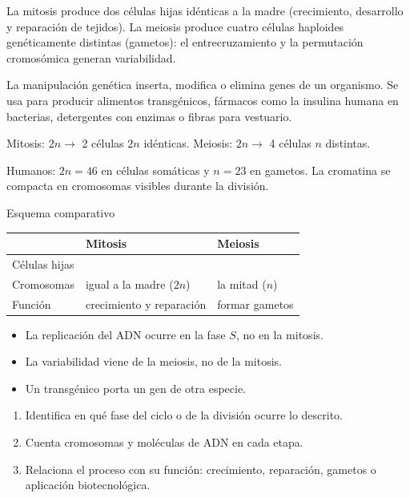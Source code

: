 \documentclass[10pt,a4paper,twocolumn]{article}
\begin{document}
La mitosis produce dos células hijas idénticas a la madre (crecimiento, desarrollo y reparación de tejidos). La meiosis produce cuatro células haploides genéticamente distintas (gametos): el entrecruzamiento y la permutación cromosómica generan variabilidad.

La manipulación genética inserta, modifica o elimina genes de un organismo. Se usa para producir alimentos transgénicos, fármacos como la insulina humana en bacterias, detergentes con enzimas o fibras para vestuario.

\begin{mecanismo}
Mitosis: $2n\rightarrow$ 2 células $2n$ idénticas. Meiosis: $2n\rightarrow$ 4 células $n$ distintas.

Humanos: $2n=46$ en células somáticas y $n=23$ en gametos. La cromatina se compacta en cromosomas visibles durante la división.
\end{mecanismo}

{\sffamily\footnotesize\color{zinc500} Esquema comparativo}
\begin{center}\small
\begin{tabular}{@{}>{\raggedright\arraybackslash}p{\dimexpr(\linewidth-4\tabcolsep)/3\relax}>{\raggedright\arraybackslash}p{\dimexpr(\linewidth-4\tabcolsep)/3\relax}>{\raggedright\arraybackslash}p{\dimexpr(\linewidth-4\tabcolsep)/3\relax}@{}}
\toprule
 & \textbf{Mitosis} & \textbf{Meiosis} \\
\midrule
Células hijas & 2 & 4 \\
Cromosomas & igual a la madre ($2n$) & la mitad ($n$) \\
Función & crecimiento y reparación & formar gametos \\
\bottomrule
\end{tabular}
\end{center}

\begin{ideasclave}
\begin{itemize}
  \item La replicación del ADN ocurre en la fase $S$, no en la mitosis.
  \item La variabilidad viene de la meiosis, no de la mitosis.
  \item Un transgénico porta un gen de otra especie.
\end{itemize}
\end{ideasclave}

\begin{metodo}
\begin{enumerate}
  \item Identifica en qué fase del ciclo o de la división ocurre lo descrito.
  \item Cuenta cromosomas y moléculas de ADN en cada etapa.
  \item Relaciona el proceso con su función: crecimiento, reparación, gametos o aplicación biotecnológica.
\end{enumerate}
\end{metodo}
\end{document}
